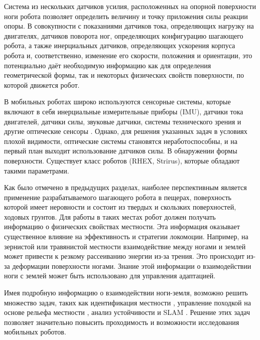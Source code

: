 Система из нескольких датчиков усилия, расположенных на опорной поверхности ноги робота позволяет определить величину и точку приложения силы реакции опоры. В совокупности с показаниями датчиков тока, определяющих нагрузку на двигателях, датчиков поворота ног, определяющих конфигурацию шагающего робота, а также инерциальных датчиков, определяющих ускорения корпуса робота и, соответственно, изменение его скорости, положения и ориентации, это потенциально даёт необходимую информацию как для определения геометрической формы, так и некоторых физических свойств поверхности, по которой движется робот.

В мобильных роботах широко используются сенсорные системы, которые включают в себя инерциальные измерительные приборы (IMU), датчики тока двигателей, датчики силы, звуковые датчики, системы технического зрения и другие оптические сенсоры \cite{libby_using_2012,ojeda_terrain_2006,peters_analysis_2006}. Однако, для решения указанных задач в условиях плохой видимости, оптические системы становятся неработоспособны, и на первый план выходит использование датчиков силы. В обнаружении формы поверхности. Существует класс роботов (RHEX, Strirus), которые обладают такими параметрами.

Как было отмечено в предыдущих разделах, наиболее перспективным является применение разрабатываемого шагающего робота в пещерах, поверхность которой имеет неровности и  состоит из твердых и скользких поверхностей, ходовых грунтов. Для работы в таких местах робот должен получать информацию о физических свойствах местности. Эта информация оказывает существенное влияние на эффективность и стратегии локомоции. Например, на зернистой или травянистой местности взаимодействие между ногами и землей может привести к резкому рассеиванию энергии из-за трения. Это происходит из-за деформации поверхности ногами. Знание этой информации о взаимодействии ноги с землей может быть использовано для управления адаптацией.

Имея подробную информацию о взаимодействии ноги-земля, возможно решить множество задач, таких как идентификация местности \cite{wuIntegratedGroundReaction2016, walasTerrainClassificationLocomotion2016, mrva_feature_2015, dallaire_learning_2015}, управление походкой на основе рельефа местности \cite{wuTactileSensingTerrainBased2020, weingarten_automated_2004}, анализ устойчивости и SLAM \cite{odenthal_nonlinear_1999, peters_analysis_2006, Altendorfer2001}. Решение этих задач позволяет значительно повысить проходимость и возможности исследования мобильных роботов.


